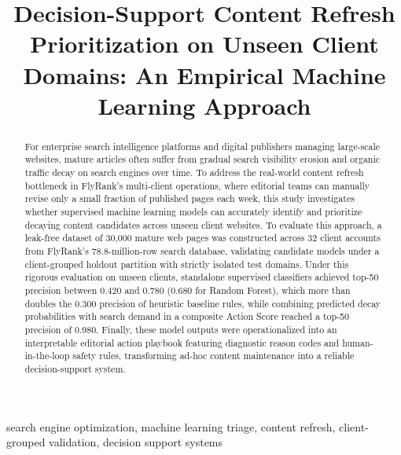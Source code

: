 \documentclass[conference]{IEEEtran}
\begin{document}
\title{Decision-Support Content Refresh Prioritization on Unseen Client Domains: An Empirical Machine Learning Approach}

\author{
}

\maketitle

\begin{abstract}
For enterprise search intelligence platforms and digital publishers managing large-scale websites, mature articles often suffer from gradual search visibility erosion and organic traffic decay on search engines over time.
To address the real-world content refresh bottleneck in FlyRank's multi-client operations, where editorial teams can manually revise only a small fraction of published pages each week, this study investigates whether supervised machine learning models can accurately identify and prioritize decaying content candidates across unseen client websites.
To evaluate this approach, a leak-free dataset of 30,000 mature web pages was constructed across 32 client accounts from FlyRank's 78.8-million-row search database, validating candidate models under a client-grouped holdout partition with strictly isolated test domains.
Under this rigorous evaluation on unseen clients, standalone supervised classifiers achieved top-50 precision between 0.420 and 0.780 (0.680 for Random Forest), which more than doubles the 0.300 precision of heuristic baseline rules, while combining predicted decay probabilities with search demand in a composite Action Score reached a top-50 precision of 0.980.
Finally, these model outputs were operationalized into an interpretable editorial action playbook featuring diagnostic reason codes and human-in-the-loop safety rules, transforming ad-hoc content maintenance into a reliable decision-support system.
\end{abstract}

\begin{IEEEkeywords}
search engine optimization, machine learning triage, content refresh, client-grouped validation, decision support systems
\end{IEEEkeywords}
\end{document}
